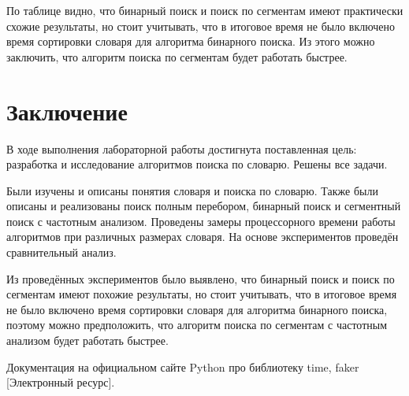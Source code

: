 \documentclass[12pt,a4paper]{report}
\begin{document}
По таблице видно, что бинарный поиск и поиск по сегментам имеют практически схожие результаты, но стоит 
учитывать, что в итоговое время не было включено время сортировки словаря для алгоритма бинарного поиска.
Из этого можно заключить, что алгоритм поиска по сегментам будет работать быстрее.

\newpage
\chapter*{Заключение}

В ходе выполнения лабораторной работы достигнута поставленная цель: разработка и исследование алгоритмов 
поиска по словарю. Решены все задачи.

Были изучены и описаны понятия словаря и поиска по словарю. 
Также были описаны и реализованы поиск полным перебором, бинарный поиск и сегментный поиск с частотным 
анализом.
Проведены замеры процессорного времени работы алгоритмов при различных размерах словаря. 
На основе экспериментов проведён сравнительный анализ.

Из проведённых экспериментов было выявлено, что бинарный поиск и поиск по сегментам имеют похожие 
результаты, но стоит учитывать, что в итоговое время не было включено время сортировки словаря для 
алгоритма бинарного поиска, поэтому можно предположить, что алгоритм поиска по сегментам с частотным 
анализом будет работать быстрее.

\newpage
\renewcommand\bibname{Список литературы}
\makeatletter %
\def\@biblabel#1{#1. }
\makeatother
\begin{thebibliography}{2}
     Документация на официальном сайте Python про библиотеку time, faker [Электронный ресурс]. 
\end{thebibliography}
\end{document}
